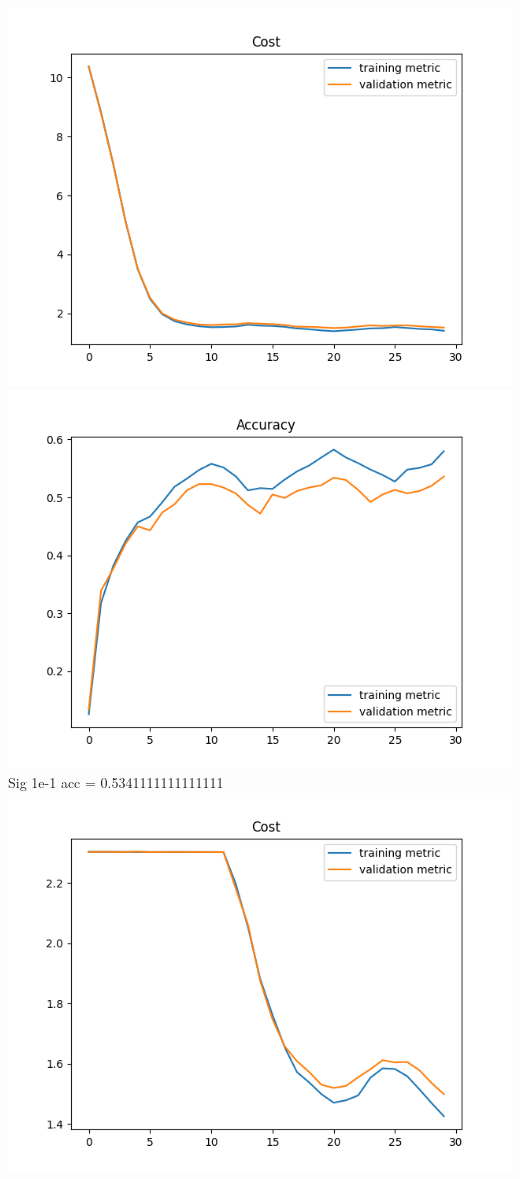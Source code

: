 \documentclass[11pt,a4paper]{article}
\begin{document}
\includegraphics[width=\textwidth]{no_batch_norm_sig=1e-1_cost-.png}
\includegraphics[width=\textwidth]{no_batch_norm_sig=1e-1_accuracy-.png}
Sig 1e-1 acc = 0.5341111111111111\\
\includegraphics[width=\textwidth]{no_batch_norm_sig=1e-3_cost-.png}
\end{document}
